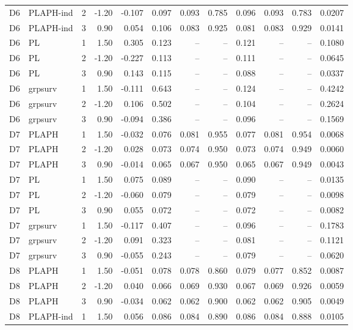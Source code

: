 \begin{longtable}{cllrrrrrrrrr}
D6 & PLAPH-ind & 2 & -1.20 & -0.107 & 0.097 & 0.093 & 0.785 & 0.096 & 0.093 & 0.783 & 0.0207 \\
D6 & PLAPH-ind & 3 & 0.90 & 0.054 & 0.106 & 0.083 & 0.925 & 0.081 & 0.083 & 0.929 & 0.0141 \\
D6 & PL & 1 & 1.50 & 0.305 & 0.123 & -- & -- & 0.121 & -- & -- & 0.1080 \\
D6 & PL & 2 & -1.20 & -0.227 & 0.113 & -- & -- & 0.111 & -- & -- & 0.0645 \\
D6 & PL & 3 & 0.90 & 0.143 & 0.115 & -- & -- & 0.088 & -- & -- & 0.0337 \\
D6 & grpsurv & 1 & 1.50 & -0.111 & 0.643 & -- & -- & 0.124 & -- & -- & 0.4242 \\
D6 & grpsurv & 2 & -1.20 & 0.106 & 0.502 & -- & -- & 0.104 & -- & -- & 0.2624 \\
D6 & grpsurv & 3 & 0.90 & -0.094 & 0.386 & -- & -- & 0.096 & -- & -- & 0.1569 \\
D7 & PLAPH & 1 & 1.50 & -0.032 & 0.076 & 0.081 & 0.955 & 0.077 & 0.081 & 0.954 & 0.0068 \\
D7 & PLAPH & 2 & -1.20 & 0.028 & 0.073 & 0.074 & 0.950 & 0.073 & 0.074 & 0.949 & 0.0060 \\
D7 & PLAPH & 3 & 0.90 & -0.014 & 0.065 & 0.067 & 0.950 & 0.065 & 0.067 & 0.949 & 0.0043 \\
D7 & PL & 1 & 1.50 & 0.075 & 0.089 & -- & -- & 0.090 & -- & -- & 0.0135 \\
D7 & PL & 2 & -1.20 & -0.060 & 0.079 & -- & -- & 0.079 & -- & -- & 0.0098 \\
D7 & PL & 3 & 0.90 & 0.055 & 0.072 & -- & -- & 0.072 & -- & -- & 0.0082 \\
D7 & grpsurv & 1 & 1.50 & -0.117 & 0.407 & -- & -- & 0.096 & -- & -- & 0.1783 \\
D7 & grpsurv & 2 & -1.20 & 0.091 & 0.323 & -- & -- & 0.081 & -- & -- & 0.1121 \\
D7 & grpsurv & 3 & 0.90 & -0.055 & 0.243 & -- & -- & 0.079 & -- & -- & 0.0620 \\
D8 & PLAPH & 1 & 1.50 & -0.051 & 0.078 & 0.078 & 0.860 & 0.079 & 0.077 & 0.852 & 0.0087 \\
D8 & PLAPH & 2 & -1.20 & 0.040 & 0.066 & 0.069 & 0.930 & 0.067 & 0.069 & 0.926 & 0.0059 \\
D8 & PLAPH & 3 & 0.90 & -0.034 & 0.062 & 0.062 & 0.900 & 0.062 & 0.062 & 0.905 & 0.0049 \\
D8 & PLAPH-ind & 1 & 1.50 & 0.056 & 0.086 & 0.084 & 0.890 & 0.086 & 0.084 & 0.888 & 0.0105 \\

\end{longtable}
